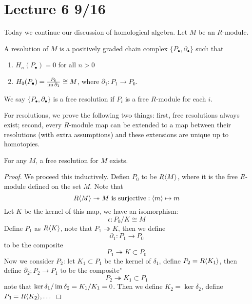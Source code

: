 \section{Lecture 6 9/16}
Today we continue our discussion of homological algebra. Let $M$ be an $R$-module. 
\begin{defn}[resolution]
    A resolution of $M$ is a positively graded chain complex $\{P_\bullet, \partial_\bullet\}$ such that 
    \begin{enumerate}
        \item $H_n(P_\bullet)=0$ for all $n>0$
        \item $H_0(P_\bullet)=\frac{P_0}{\operatorname{im}\partial_1}\cong M$, where $\partial_1:P_1\to P_0$.
    \end{enumerate}
    We say $\{P_\bullet,\partial_\bullet\}$ is a free resolution if $P_i$ is a free $R$-module for each $i$.
\end{defn}
For resolutions, we prove the following two things: first, free resolutions always exist; second, every $R$-module map can be extended to a map between their resolutions (with extra assumptions) and these extensions are unique up to homotopies.
\begin{prop}
    For any $M$, a free resolution for $M$ exists.
\end{prop}
\begin{proof}
    We proceed this inductively. Defien $P_0$ to be $R\langle M\rangle$, where it is the free $R$-module defined on the set $M$. Note that 
    \begin{equation*}
        R\langle M\rangle\twoheadrightarrow M \text{ is surjective}: \langle m\rangle\mapsto m
    \end{equation*}
    Let $K$ be the kernel of this map, we have an isomorphism:
    \begin{equation*}
        \epsilon: P_0/K\cong M
    \end{equation*}
    Define $P_1$ as $R\langle K\rangle$, note that $P_1\twoheadrightarrow K$, then we define 
    \begin{equation*}
        \partial_1: P_1\to P_0
    \end{equation*}
    to be the composite 
    \begin{equation*}
        P_1\twoheadrightarrow K\subset P_0
    \end{equation*}
    Now we consider $P_2$: let $K_1\subset P_1$ be the kernel of $\delta_1$, define $P_2=R\langle K_1\rangle$, then define $\partial_2; P_2\to P_1$ to be the composite"
    \begin{equation*}
        P_2\twoheadrightarrow K_1\subset P_1
    \end{equation*}
    note that $\ker\delta_1/\operatorname{im}\delta_2=K_1/K_1=0$. Then we define $K_2=\ker\delta_2$, define $P_3=R\langle K_2\rangle, \dots$
\end{proof}
